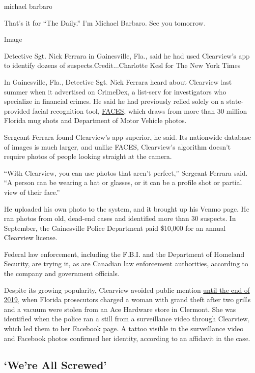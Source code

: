 michael barbaro

That's it for ``The Daily.'' I'm Michael Barbaro. See you tomorrow.

Image

Detective Sgt. Nick Ferrara in Gainesville, Fla., said he had used
Clearview's app to identify dozens of suspects.Credit...Charlotte Kesl
for The New York Times

In Gainesville, Fla., Detective Sgt. Nick Ferrara heard about Clearview
last summer when it advertised on CrimeDex, a list-serv for
investigators who specialize in financial crimes. He said he had
previously relied solely on a state-provided facial recognition tool,
\href{https://www.nytimes.com/2020/01/12/technology/facial-recognition-police.html}{FACES},
which draws from more than 30 million Florida mug shots and Department
of Motor Vehicle photos.

Sergeant Ferrara found Clearview's app superior, he said. Its nationwide
database of images is much larger, and unlike FACES, Clearview's
algorithm doesn't require photos of people looking straight at the
camera.

``With Clearview, you can use photos that aren't perfect,'' Sergeant
Ferrara said. ``A person can be wearing a hat or glasses, or it can be a
profile shot or partial view of their face.''

He uploaded his own photo to the system, and it brought up his Venmo
page. He ran photos from old, dead-end cases and identified more than 30
suspects. In September, the Gainesville Police Department paid \$10,000
for an annual Clearview license.

Federal law enforcement, including the F.B.I. and the Department of
Homeland Security, are trying it, as are Canadian law enforcement
authorities, according to the company and government officials.

Despite its growing popularity, Clearview avoided public mention
\href{https://www.wftv.com/news/local/florida-law-enforcement-agencies-use-facial-recognition-identify-alleged-thief/SGHPUGB5W5CX3FYVSLU7P6EV7I/}{until
the end of 2019}, when Florida prosecutors charged a woman with grand
theft after two grills and a vacuum were stolen from an Ace Hardware
store in Clermont. She was identified when the police ran a still from a
surveillance video through Clearview, which led them to her Facebook
page. A tattoo visible in the surveillance video and Facebook photos
confirmed her identity, according to an affidavit in the case.

\hypertarget{were-all-screwed}{%
\subsection{`We're All Screwed'}\label{were-all-screwed}}

